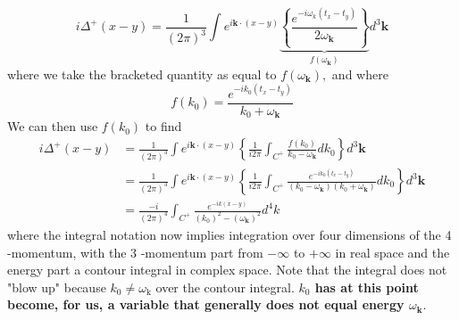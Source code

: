 $$
i \Delta^{+}(x-y)=\frac{1}{(2 \pi)^{3}} \int e^{i \mathbf{k} \cdot(x-y)}\underbrace{\left\{\frac{e^{-i \omega_{k}\left(t_{x}-t_{y}\right)}}{2 \omega_{\mathbf{k}}}\right\}}_{f\left(\omega_{\mathbf{k}}\right)} d^{3} \mathbf{k}
$$
where we take the bracketed quantity as equal to $f\left(\omega_{\mathbf{k}}\right),$ and where
$$
f\left(k_{0}\right)=\frac{e^{-i k_{0}\left(t_{x}-t_{y}\right)}}{k_{0}+\omega_{\mathbf{k}}}
$$
We can then use $f(k_0)$ to find
\begin{equation}
\begin{aligned}
i \Delta^{+}(x-y) &=\frac{1}{(2 \pi)^{3}} \int e^{i \mathbf{k} \cdot(x-y)}\left\{\frac{1}{i 2 \pi} \int_{C^{+}} \frac{f\left(k_{0}\right)}{k_{0}-\omega_{\mathbf{k}}} d k_{0}\right\} d^{3} \mathbf{k} \\
&=\frac{1}{(2 \pi)^{3}} \int e^{i \mathbf{k} \cdot(x-y)}\left\{\frac{1}{i 2 \pi} \int_{C^{+}} \frac{e^{-i k_{0}\left(t_{x}-t_{y}\right)}}{\left(k_{0}-\omega_{\mathbf{k}}\right)\left(k_{0}+\omega_{\mathbf{k}}\right)} d k_{0}\right\} d^{3} \mathbf{k} \\
&=\frac{-i}{(2 \pi)^{4}} \int_{C^+} \frac{e^{-i k(x-y)}}{\left(k_{0}\right)^{2}-\left(\omega_{\mathbf{k}}\right)^{2}} d^{4} k
\end{aligned}
\end{equation}
where the integral notation now implies integration over four dimensions of the 4 -momentum, with the 3 -momentum part from $-\infty$ to $+\infty$ in real space and the energy part a contour integral in complex space. Note that the integral does not "blow up" because $k_{0} \neq \omega_{\mathrm{k}}$ over the contour integral. \textbf{$k_0$ has at this point become, for us, a variable that generally does not equal energy $\omega_{\mathbf{k}}$}.

